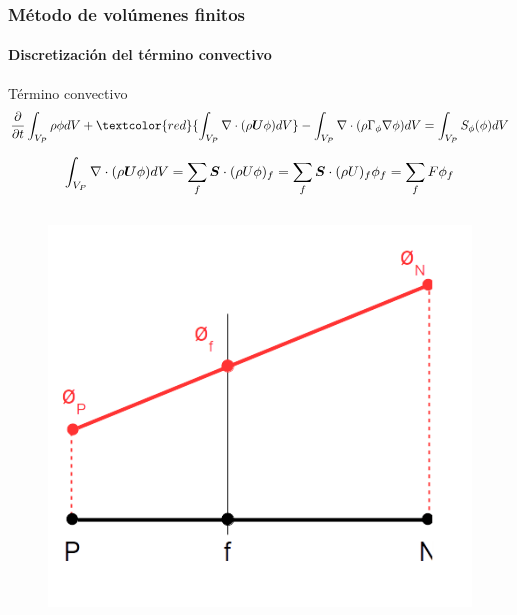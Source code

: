 \begin{frame}
    \frametitle{M\'etodo de vol\'umenes finitos}
    \framesubtitle{Discretizaci\'on del t\'ermino convectivo}
    
    \vspace*{-0.1cm}
    \begin{block}{T\'ermino convectivo}
        \footnotesize
        \begin{equation*}
            \frac{\partial}{\partial t} \int_{V_{P}}\rho \phi dV + 
            \textcolor{red}{ \int_{V_{P}}\nabla \cdot (\rho \bs{U} \phi) dV } - 
            \int_{V_{P}}\nabla \cdot (\rho \Gamma_{\phi} \nabla \phi) dV  =  
            \int_{V_{P}}S_{\phi}(\phi) dV 
        \end{equation*}
    \end{block}     
    

    \footnotesize
    $$ \int_{V_{P}}\nabla \cdot (\rho \boldsymbol{U} \phi) dV = \displaystyle \sum_f \boldsymbol{S} \cdot (\rho U \phi)_f = \displaystyle \sum_f \boldsymbol{S} \cdot (\rho U)_f \phi_f = \sum_f F \phi_f $$

    
    \begin{columns}
            
        \vspace*{-0.8cm}
        \begin{figure}[h]
            \begin{center}
                \includegraphics[scale=0.25]{Imagenes/faceflux}
            \end{center}
        \end{figure}     
                                               

\end{columns}
\end{frame}
